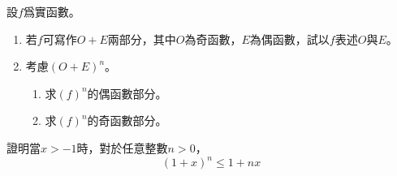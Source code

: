 \documentclass[12pt]{article}
\begin{document}
    設$f$爲實函數。\begin{enumerate}
        \item 若$f$可寫作$O+E$兩部分，其中$O$為奇函數，$E$為偶函數，試以$f$表述$O$與$E$。
        \item 考慮$(O+E)^n$。\begin{enumerate}
            \item 求$(f)^n$的偶函數部分。
            \item 求$(f)^n$的奇函數部分。
        \end{enumerate}
    \end{enumerate}

    證明當$x>-1$時，對於任意整數$n>0$，$$(1+x)^n\leq 1+nx$$
\end{document}
